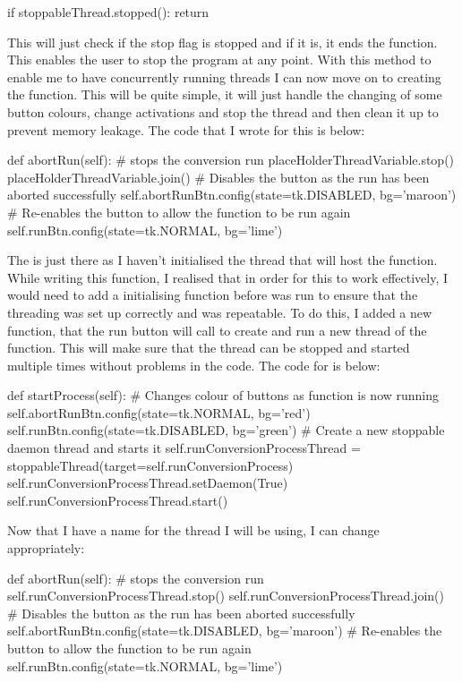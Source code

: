 \documentclass{report}
\begin{document}
\begin{python}
if stoppableThread.stopped():
    return
\end{python}
This will just check if the stop flag is stopped and if it is, it ends the function. This enables the user to stop the program at any point.
\newline
With this method to enable me to have concurrently running threads I can now move on to creating the  function. This will be quite simple, it will just handle the changing of some button colours, change activations and stop the  thread and then clean it up to prevent memory leakage. The code that I wrote for this is below:
\begin{python}
def abortRun(self):
    # stops the conversion run
    placeHolderThreadVariable.stop()
    placeHolderThreadVariable.join()
    # Disables the button as the run has been aborted successfully
    self.abortRunBtn.config(state=tk.DISABLED, bg='maroon')
    # Re-enables the button to allow the function to be run again
    self.runBtn.config(state=tk.NORMAL, bg='lime')
\end{python}
The  is just there as I haven't initialised the thread that will host the  function.
\newline
While writing this function, I realised that in order for this to work effectively, I would need to add a initialising function before  was run to ensure that the threading was set up correctly and was repeatable. To do this, I added a new function,  that the run button will call to create and run a new thread of the  function. This will make sure that the thread can be stopped and started multiple times without problems in the code. The code for  is below:
\begin{python}
def startProcess(self):
    # Changes colour of buttons as function is now running
    self.abortRunBtn.config(state=tk.NORMAL, bg='red')
    self.runBtn.config(state=tk.DISABLED, bg='green')
    # Create a new stoppable daemon thread and starts it
    self.runConversionProcessThread = stoppableThread(target=self.runConversionProcess)
    self.runConversionProcessThread.setDaemon(True)
    self.runConversionProcessThread.start()
\end{python}
Now that I have a name for the thread I will be using, I can change  appropriately:
\begin{python}
def abortRun(self):
    # stops the conversion run
    self.runConversionProcessThread.stop()
    self.runConversionProcessThread.join()
    # Disables the button as the run has been aborted successfully
    self.abortRunBtn.config(state=tk.DISABLED, bg='maroon')
    # Re-enables the button to allow the function to be run again
    self.runBtn.config(state=tk.NORMAL, bg='lime')
\end{python}
\end{document}
